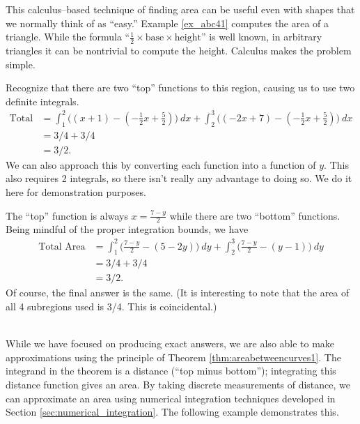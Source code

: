 This calculus--based technique of finding area can be useful even with shapes that we normally think of as ``easy.'' Example \ref{ex_abc41} computes the area of a triangle. While the formula ``$\frac12\times\text{base}\times\text{height}$'' is well known, in arbitrary triangles it can be nontrivial to compute the height. Calculus makes the problem simple.\\


{Recognize that there are two ``top'' functions to this region, causing us to use two definite integrals.
\begin{align*}
\text{Total Area} &= \int_1^2\big((x+1)-(-\frac12x+\frac52)\big)\ dx + \int_2^3\big((-2x+7)-(-\frac12x+\frac52)\big)\ dx \\
						&= 3/4+3/4\\
						&=3/2.
\end{align*}
We can also approach this by converting each function into a function of $y$. This also requires 2 integrals, so there isn't really any advantage to doing so. We do it here for demonstration purposes.

The ``top'' function is always $x=\frac{7-y}2$ while there are two ``bottom'' functions. Being mindful of the proper integration bounds, we have
\begin{align*}
\text{Total Area} &= \int_1^2\big(\frac{7-y}2 - (5-2y)\big)\ dy + \int_2^3\big(\frac{7-y}2-(y-1)\big)\ dy \\
			&= 3/4 + 3/4\\
			&= 3/2.
\end{align*}
Of course, the final answer is the same. (It is interesting to note that the area of all 4 subregions used is 3/4. This is coincidental.)
}\\

While we have focused on producing exact answers, we are also able to make approximations using the principle of Theorem \ref{thm:areabetweencurves1}. The integrand in the theorem is a distance (``top minus bottom''); integrating this distance function gives an area. By taking discrete measurements of distance, we can approximate an area using numerical integration techniques developed in Section \ref{sec:numerical_integration}. The following example demonstrates this.\\

